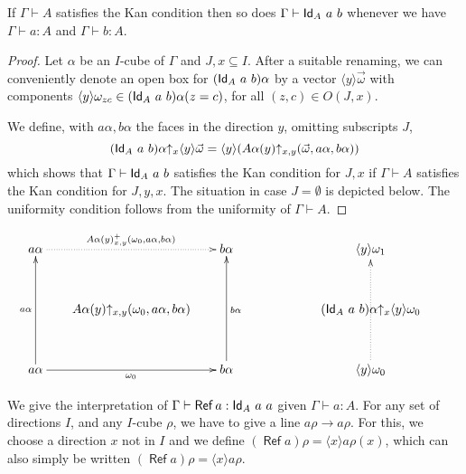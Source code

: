 \documentclass[10pt,a4paper]{article}
\DeclareMathOperator{\Ref}{\mathsf{Ref}}
\newcommand{\Id}{{\sf Id}}
\newcommand{\es}{\emptyset}
\newcommand{\rupx}[1]{#1{\uparrow_{x}}}
\newcommand{\rupxy}[1]{#1{\uparrow_{x,y}}}
\newcommand{\bind}[2]{{\langle}#1{\rangle}#2}
\begin{document}
\begin{theorem}
If $\Gamma\vdash A$  satisfies the Kan condition then so does $\Gamma\vdash\Id_A~a~b$ whenever we have
$\Gamma\vdash a:A$ and $\Gamma\vdash b:A$.
\end{theorem}

\begin{proof}
  Let $\alpha$ be an $I$-cube of $\Gamma$ and $J,x\subseteq I$. After
  a suitable renaming, we can conveniently denote an open box for
  $(\Id_A~a~b)\alpha$ by a vector $\bind{y}{\vec{\omega}}$ with
  components $\bind{y}{\omega_{zc}}\in(\Id_A~a~b)\alpha(z=c)$, for all
  $(z,c)\in O(J,x)$.

  We define, with $a\alpha,b\alpha$ the faces in the direction $y$,
  omitting subscripts $J$,
  $$
  \rupx{(\Id_A~a~b)\alpha}\bind{y}{\vec{\omega}} =
  \bind{y}{(\rupxy{A\alpha(y)} (\vec{\omega},a\alpha,b\alpha))}
  $$
  which shows that $\Gamma\vdash \Id_A~a~b$ satisfies the Kan
  condition for $J,x$ if $\Gamma\vdash A$ satisfies the Kan condition for
  $J,y,x$. The situation in case $J=\es$ is depicted below.  The
  uniformity condition follows from the uniformity of $\Gamma\vdash A$.
\end{proof}
\[
\xymatrix@R=1.1cm@C=.6cm{
a\alpha\ar@{.>}[rr]^{A\alpha(y)_{x,y}^+(\omega_0,a\alpha,b\alpha)}&      & b\alpha                                     &&&
\bind{y}{\omega_1}                                &          \\
                                      &\rupxy{A\alpha(y)}(\omega_0,a\alpha,b\alpha)&                          &&&
                                      \rupx{(\Id_A~a~b)\alpha} \bind{y}{\omega_0}&                           \\
a\alpha\ar[rr]_{\omega_0}\ar[uu]^{a\alpha}&      & b\alpha\ar[uu]_{b\alpha}                                     &&&
\bind{y}{\omega_0}\ar@{.>}[uu]     &                             \\
}
\]

We give the interpretation of $\Gamma\vdash \Ref a:\Id_A~a~a$ given
$\Gamma\vdash a:A$. For any set of directions $I$, and any $I$-cube
$\rho$, we have to give a line $a\rho\to a\rho$. For this, we choose a
direction $x$ not in $I$ and we define 
$(\Ref a)\rho = \bind{x}{a\rho(x)}$, 
which can also simply be written $(\Ref a)\rho = \bind{x}{a\rho}$.
\end{document}
